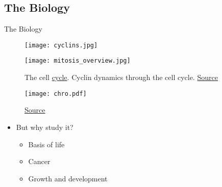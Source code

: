 \subsection{The Biology}
\begin{frame}[allowframebreaks]{The Biology}
\begin{figure}
\centering
\texttt{[image: cyclins.jpg]}
\end{figure}
\begin{figure}
\texttt{[image: mitosis\_overview.jpg]}
\caption {\tiny {The cell \href{http://www2.le.ac.uk/departments/genetics/vgec/schoolscolleges/topics/cellcycle-mitosis-meiosis}{cycle}. Cyclin dynamics through the cell cycle. \href{https://www.boundless.com/biology/textbooks/boundless-biology-textbook/cell-reproduction-10/control-of-the-cell-cycle-89/regulator-molecules-of-the-cell-cycle-399-11626/}{\tiny Source}}}
\end{figure}

\framebreak
\begin{figure}
\texttt{[image: chro.pdf]}
\caption{\href{http://www.nature.com/nrm/journal/v15/n11/pdf/nrm3888.pdf}{Source}}
%
\end{figure}
\begin{itemize} 
	\item But why study it?	
		\begin{itemize}
	  	\item{Basis of life}
		\item{Cancer}
		\item{Growth and development}
		\end{itemize}
\end{itemize}
\end{frame}

